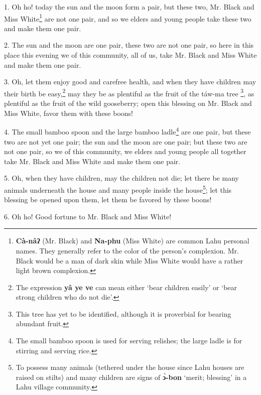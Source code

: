 \setcounter{footnote}{0}

1. Oh ho! today the sun and the moon form a pair, but these two, Mr. Black and Miss
White\footnote{\textbf{Cà-nâʔ} (Mr. Black) and \textbf{Na-phu} (Miss White) are common Lahu personal names. They generally refer to the color of the person's complexion. Mr. Black would be a man of dark skin while Miss White would have a rather light brown complexion.} are not one pair, and so we elders and young people take these two and
make them one pair.

2. The sun and the moon are one pair, these two are not one pair, so here in this
place this evening we of this community, all of us, take Mr. Black and Miss White
and make them one pair.

3. Oh, let them enjoy good and carefree health, and when they have children may
their birth be easy,\footnote{The expression \textbf{yâ ye ve} can mean either `bear children easily' or `bear strong children who do not die'.} may they be as plentiful as the fruit of the táw-ma tree
\footnote{This tree has yet to be identified, although it is proverbial for bearing abundant fruit.}, as plentiful as the fruit of the wild gooseberry; open this blessing on Mr.
Black and Miss White, favor them with these boons!

4. The small bamboo spoon and the large bamboo ladle\footnote{The small bamboo spoon is used for serving relishes; the large ladle is for stirring and serving rice.} are one pair, but these
two are not yet one pair; the sun and the moon are one pair; but these two are
not one pair, so we of this community, we elders and young people all together
take Mr. Black and Miss White and make them one pair.

5. Oh, when they have children, may the children not die; let there be many animals
underneath the house and many people inside the house\footnote{To possess many animals (tethered under the house since Lahu houses are raised on stilts) and many children are signs of \textbf{ɔ̀-bon} `merit; blessing' in a Lahu village community.}; let this blessing be
opened upon them, let them be favored by these boons!

6. Oh ho! Good fortune to Mr. Black and Miss White!

